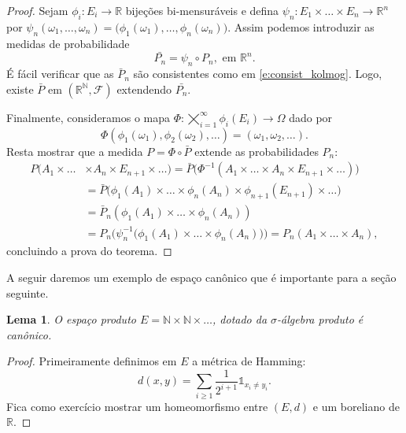 \documentclass[reqno]{article}
\newcommand*\1{\mathds{1}}
\newtheorem{lemma}[theorem]{Lema}
\begin{document}
\begin{proof}
  Sejam $\phi_i: E_i \to \mathbb{R}$ bijeções bi-mensuráveis e defina $\psi_n: E_1 \times \dots \times E_n \to \mathbb{R}^n$ por $\psi_n(\omega_1, \dots, \omega_n) = \big(\phi_1(\omega_1), \dots, \phi_n(\omega_n)\big)$.
  Assim podemos introduzir as medidas de probabilidade
  \begin{equation}
    \bar{P_n} = \psi_n \circ P_n, \text{ em $\mathbb{R}^n$}.
  \end{equation}
  É fácil verificar que as $\bar P_n$ são consistentes como em \eqref{e:consist_kolmog}.
  Logo, existe $\bar{P}$ em $(\mathbb{R}^\mathbb{N}, \mathcal{F})$ extendendo $\bar{P_n}$.

  Finalmente, consideramos o mapa $\Phi: \bigtimes_{i=1}^\infty \phi_i(E_i) \to \Omega$ dado por
  \begin{equation}
    \Phi(\phi_1(\omega_1), \phi_2(\omega_2), \dots) = (\omega_1, \omega_2, \dots).
  \end{equation}
  Resta mostrar que a medida $P = \Phi \circ \bar{P}$ extende as probabilidades $P_n$:
  \begin{equation}
    \begin{split}
      P\big(A_1 \times \dots & \times A_n \times E_{n+1} \times \dots\big) = \bar{P} \big(\Phi^{-1}(A_1 \times \dots \times A_n \times E_{n+1} \times \dots)\big)\\
      & = \bar{P} \big( \phi_1(A_1) \times \dots \times \phi_n(A_n) \times \phi_{n+1}(E_{n+1}) \times \dots \big)\\
      & = \bar{P}_n (\phi_1(A_1) \times \dots \times \phi_n(A_n))\\
      & = P_n \big(\psi_n^{-1}\big(\phi_1(A_1) \times \dots \times \phi_n(A_n)\big)\big) = P_n(A_1 \times \dots \times A_n),
    \end{split}
  \end{equation}
  concluindo a prova do teorema.
\end{proof}

A seguir daremos um exemplo de espaço canônico que é importante para a seção seguinte.

\begin{lemma}
  \label{l:NN_canonico}
  O espaço produto $E = \mathbb{N} \times \mathbb{N} \times \dots$, dotado da $\sigma$-álgebra produto é canônico.
\end{lemma}

\begin{proof}
  Primeiramente definimos em $E$ a métrica de Hamming:
  \begin{equation}
    \label{e:hamming_distance}
    d(x,y) = \sum_{i \geq 1} \frac{1}{2^{i + 1}} \1_{x_i \neq y_i}.
  \end{equation}
  Fica como exercício mostrar um homeomorfismo entre $(E,d)$ e um boreliano de $\mathbb{R}$.
\end{proof}
\end{document}
